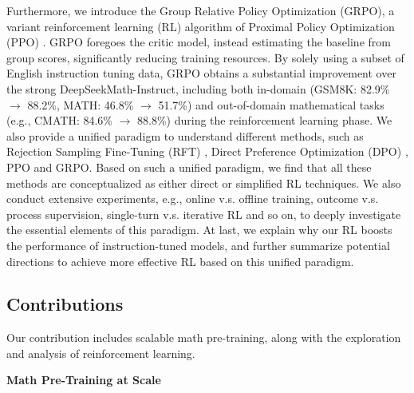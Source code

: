 Furthermore, we introduce the Group Relative Policy Optimization (GRPO), a variant reinforcement learning (RL) algorithm of Proximal Policy Optimization (PPO) \citep{schulman2017proximal}. GRPO foregoes the critic model, instead estimating the baseline from group scores, significantly reducing training resources. By solely using a subset of English instruction tuning data, GRPO obtains a substantial improvement over the strong DeepSeekMath-Instruct, including both in-domain (GSM8K: 82.9\% $\rightarrow$ 88.2\%, MATH: 46.8\% $\rightarrow$ 51.7\%) and out-of-domain mathematical tasks (e.g., CMATH: 84.6\% $\rightarrow$ 88.8\%) during the reinforcement learning phase. We also provide a unified paradigm to understand different methods, such as Rejection Sampling Fine-Tuning (RFT) \citep{yuan2023scaling}, Direct Preference Optimization (DPO) \citep{dpo}, PPO and GRPO. Based on such a unified paradigm, we find that all these methods are conceptualized as either direct or simplified RL techniques. We also conduct extensive experiments, e.g., online v.s. offline training, outcome v.s. process supervision, single-turn v.s. iterative RL and so on, to deeply investigate the essential elements of this paradigm. At last, we explain why our RL boosts the performance of instruction-tuned models, and further summarize potential directions to achieve more effective RL based on this unified paradigm.

\subsection{Contributions}
Our contribution includes scalable math pre-training, along with the exploration and analysis of reinforcement learning.

\textbf{Math Pre-Training at Scale}


